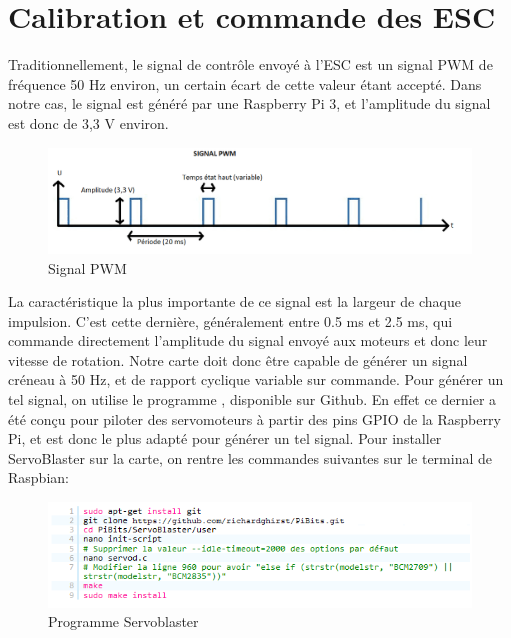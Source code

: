 \documentclass[a4paper,11pt]{report}
\begin{document}
				\newpage\section{Calibration et commande des ESC}
				
				Traditionnellement, le signal de contrôle envoyé à l'ESC est un signal PWM de fréquence 50 Hz environ, un certain écart de cette valeur étant accepté. Dans notre cas, le signal est généré par une Raspberry Pi 3, et l'amplitude du signal est donc de 3,3 V environ.
				\begin{figure}[!h]
				  \begin{center}
				  	\includegraphics[scale=0.6]{Photos/signal_pwm}
						\caption{Signal PWM}
				  \end{center}
		  	\end{figure}
				\newline\newline La caractéristique la plus importante de ce signal est la largeur de chaque impulsion. C'est cette dernière, généralement entre 0.5 ms et 2.5 ms, qui commande directement l'amplitude du signal envoyé aux moteurs et donc leur vitesse de rotation. Notre carte doit donc être capable de générer un signal créneau à 50 Hz, et de rapport cyclique variable sur commande. Pour générer un tel signal, on utilise le programme \cite{ref8}, disponible sur Github. En effet ce dernier a été conçu pour piloter des servomoteurs à partir des pins GPIO de la Raspberry Pi, et est donc le plus adapté pour générer un tel signal. Pour installer ServoBlaster sur la carte, on rentre les commandes suivantes sur le terminal de Raspbian:
				\begin{figure}[!h]
				  \begin{center}
				  	\includegraphics[scale=1]{Photos/ServoBlaster}
						\caption{Programme Servoblaster}
				  \end{center}
		  	\end{figure}
				
\end{document}
